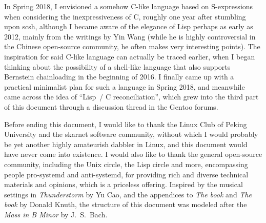 \documentclass{article}
\begin{document}
In Spring 2018, I envisioned a somehow C-like language based on S-expressions
when considering the inexpressiveness of C, roughly
one year after stumbling upon scsh, although I
became aware of the elegance of Lisp perhaps as early as 2012, mainly from
the writings by Yin Wang (while he is highly controversial in the Chinese
open-source community, he often makes very interesting points).  The
inspiration for said C-like language can actually be traced earlier, when
I began thinking about the possibility of a shell-like language that also
supports Bernstein chainloading in the beginning of
2016.  I finally came up with a practical minimalist plan for such a language%
 in Spring 2018, and meanwhile came across the idea of
``Lisp~/ C reconciliation'', which grew into the third part of this document
through a discussion thread in the Gentoo forums.

Before ending this document, I would like to thank the Linux Club of Peking
University and the skarnet software community, without which I would probably
be yet another highly amateurish dabbler in Linux, and this document would
have never come into existence.  I would also like to thank the general
open-source community, including the Unix circle, the Lisp circle and more,
encompassing people pro-systemd and anti-systemd, for providing rich and
diverse technical materials and opinions, which is a priceless offering.
Inspired by the musical settings in \emph{Thunderstorm} by Yu Cao,
and the appendices to \emph{The book} and \emph{The
book} by Donald Knuth, the structure of this
document was modeled after the \emph{Mass in B Minor} by J.~S.\ Bach.
\end{document}
